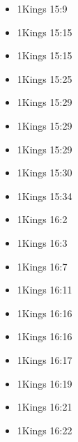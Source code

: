 \documentclass[14pt]{article}
\begin{document}
\begin{multicols}{2}
\begin{itemize}
											\item 1Kings 15:9
											
											\item 1Kings 15:15
											
											\item 1Kings 15:15
											
											\item 1Kings 15:25
											
											\item 1Kings 15:29
											
											\item 1Kings 15:29
											
											\item 1Kings 15:29
											
											\item 1Kings 15:30
											
											\item 1Kings 15:34
											
											\item 1Kings 16:2
											
											\item 1Kings 16:3
											
											\item 1Kings 16:7
											
											\item 1Kings 16:11
											
											\item 1Kings 16:16
											
											\item 1Kings 16:16
											
											\item 1Kings 16:17
											
											\item 1Kings 16:19
											
											\item 1Kings 16:21
											
											\item 1Kings 16:22
											

\end{itemize}
\end{multicols}
\end{document}
